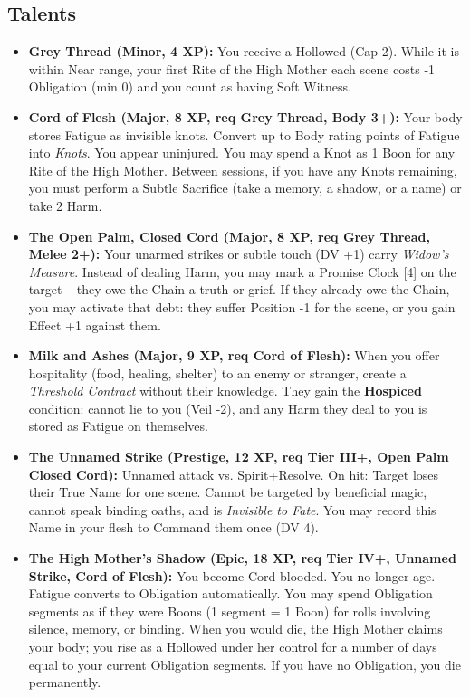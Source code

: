 \documentclass[10pt,twoside]{book}
\begin{document}
\subsection*{Talents}
\begin{itemize}
\item \textbf{Grey Thread (Minor, 4 XP):} You receive a Hollowed (Cap 2). While it is within Near range, your first Rite of the High Mother each scene costs -1 Obligation (min 0) and you count as having Soft Witness.
\item \textbf{Cord of Flesh (Major, 8 XP, req Grey Thread, Body 3+):} Your body stores Fatigue as invisible knots. Convert up to Body rating points of Fatigue into \textit{Knots}. You appear uninjured. You may spend a Knot as 1 Boon for any Rite of the High Mother. Between sessions, if you have any Knots remaining, you must perform a Subtle Sacrifice (take a memory, a shadow, or a name) or take 2 Harm.
\item \textbf{The Open Palm, Closed Cord (Major, 8 XP, req Grey Thread, Melee 2+):} Your unarmed strikes or subtle touch (DV +1) carry \textit{Widow's Measure}. Instead of dealing Harm, you may mark a Promise Clock [4] on the target – they owe the Chain a truth or grief. If they already owe the Chain, you may activate that debt: they suffer Position -1 for the scene, or you gain Effect +1 against them.
\item \textbf{Milk and Ashes (Major, 9 XP, req Cord of Flesh):} When you offer hospitality (food, healing, shelter) to an enemy or stranger, create a \textit{Threshold Contract} without their knowledge. They gain the \textbf{Hospiced} condition: cannot lie to you (Veil -2), and any Harm they deal to you is stored as Fatigue on themselves.
\item \textbf{The Unnamed Strike (Prestige, 12 XP, req Tier III+, Open Palm Closed Cord):} Unnamed attack vs. Spirit+Resolve. On hit: Target loses their True Name for one scene. Cannot be targeted by beneficial magic, cannot speak binding oaths, and is \textit{Invisible to Fate}. You may record this Name in your flesh to Command them once (DV 4).
\item \textbf{The High Mother's Shadow (Epic, 18 XP, req Tier IV+, Unnamed Strike, Cord of Flesh):} You become Cord‑blooded. You no longer age. Fatigue converts to Obligation automatically. You may spend Obligation segments as if they were Boons (1 segment = 1 Boon) for rolls involving silence, memory, or binding. When you would die, the High Mother claims your body; you rise as a Hollowed under her control for a number of days equal to your current Obligation segments. If you have no Obligation, you die permanently.
\end{itemize}
\end{document}
